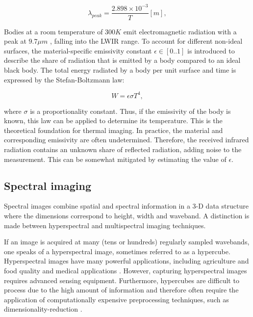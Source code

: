 \documentclass{l4proj}
\begin{document}
\begin{equation}
  \lambda_{peak} = \frac{2.898 \times 10^{-3}}{T} [m],
\end{equation}

Bodies at a room temperature of $300 K$ emit electromagnetic radiation with a peak at $9.7 \mu m$ \citep{jarc_graz_2007}, falling into the LWIR range. To account for different non-ideal surfaces, the material-specific emissivity constant $\epsilon \in [0..1]$ is introduced to describe the share of radiation that is emitted by a body compared to an ideal black body. The total energy radiated by a body per unit surface and time is expressed by the Stefan-Boltzmann law:

\begin{equation}
  W = \epsilon \sigma T^4,
\end{equation}

where $\sigma$ is a proportionality constant. Thus, if the emissivity of the body is known, this law can be applied to determine its temperature. This is the theoretical foundation for thermal imaging. In practice, the material and corresponding emissivity are often undetermined. Therefore, the received infrared radiation contains an unknown share of reflected radiation, adding noise to the measurement. This can be somewhat mitigated by estimating the value of $\epsilon$.

\subsection{Spectral imaging}

Spectral images combine spatial and spectral information in a 3-D data structure where the dimensions correspond to height, width and waveband. 
A distinction is made between hyperspectral and multispectral imaging techniques. 

If an image is acquired at many (tens or hundreds) regularly sampled wavebands, one speaks of a hyperspectral image, sometimes referred to as a hypercube. Hyperspectral images have many powerful applications, including agriculture and food quality \citep{dale_hyperspectral_2013} and medical applications \citep{lu_medical_2014}. However, capturing hyperspectral images requires advanced sensing equipment. Furthermore, hypercubes are difficult to process due to the high amount of information and therefore often require the application of computationally expensive preprocessing techniques, such as dimensionality-reduction \citep{qin_hyperspectral_2013}.
\end{document}

